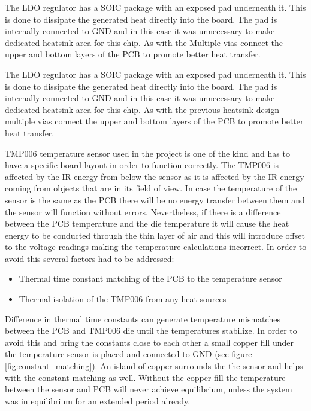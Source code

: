 The LDO regulator has a SOIC package with an exposed pad underneath it. This is done to dissipate the generated heat directly into the board. The pad is internally connected to GND and in this case it was unnecessary to make dedicated heatsink area for this chip. As with the Multiple vias connect the upper and bottom layers of the PCB to promote better heat transfer.

The LDO regulator has a SOIC package with an exposed pad underneath it. This is done to dissipate the generated heat directly into the board. The pad is internally connected to GND and in this case it was unnecessary to make dedicated heatsink area for this chip. As with the previous heatsink design multiple vias connect the upper and bottom layers of the PCB to promote better heat transfer.

TMP006 temperature sensor used in the project is one of the kind and has to have a specific board layout in order to function correctly. The TMP006 is affected by the IR energy from below the sensor as it is affected by the IR energy coming from objects that are in its field of view. In case the temperature of the sensor is the same as the PCB there will be no energy transfer between them and the sensor will function without errors. Nevertheless, if there is a difference between the PCB temperature and the die temperature it will cause the heat energy to be conducted through the thin layer of air and this will introduce offset to the voltage readings making the temperature calculations incorrect.  In order to avoid this several factors had to be addressed:

\begin{itemize}
\item Thermal time constant matching of the PCB to the temperature sensor
\item Thermal isolation of the TMP006 from any heat sources
\end{itemize}

Difference in thermal time constants can generate temperature mismatches between the PCB and TMP006 die until the temperatures stabilize. In order to avoid this and bring the constants close to each other a small copper fill under the temperature sensor is placed and connected to GND (see figure \ref{fig:constant_matching}). An island of copper surrounds the the sensor and helps with the constant matching as well. Without the copper fill the temperature between the sensor and PCB will never achieve equilibrium, unless the system was in equilibrium for an extended period already. 

